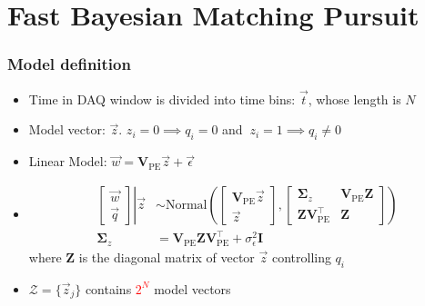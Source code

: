 \documentclass{beamer}
\begin{document}
\section{Fast Bayesian Matching Pursuit}

\begin{frame}
\frametitle{Model definition}
\begin{itemize}
    \item Time in DAQ window is divided into time bins: $\vec{t}$, whose length is $N$
    \item Model vector: $\vec{z}$. $z_i=0\implies q_i=0$ and $\ z_i=1\implies q_i\neq0$
    \item Linear Model: $\vec{w} = \bm{V}_\mathrm{PE}\vec{z} + \vec{\epsilon}$
    \item 
        \begin{align*}
            \left.
            \begin{bmatrix}
                \vec{w} \\
                \vec{q}
            \end{bmatrix}
            \right\vert\vec{z}
            &\sim \mathrm{Normal}\left(
            \begin{bmatrix}
                \bm{V}_\mathrm{PE}\vec{z} \\
                \vec{z}
            \end{bmatrix}, 
            \begin{bmatrix}
                \bm{\Sigma}_z & \bm{V}_\mathrm{PE}\bm{Z} \\
                \bm{Z}\bm{V}_\mathrm{PE}^\intercal & \bm{Z}
            \end{bmatrix}
            \right) \\
            \bm{\Sigma}_z &= \bm{V}_\mathrm{PE}\bm{Z}\bm{V}_\mathrm{PE}^\intercal+\sigma_\epsilon^2\bm{I}
        \end{align*}
    where $\bm{Z}$ is the diagonal matrix of vector $\vec{z}$ controlling $q_i$ 
    \item $\mathcal{Z}=\{\vec{z}_j\}$ contains \textcolor{red}{$2^{N}$} model vectors
\end{itemize}
\end{frame}
\end{document}
